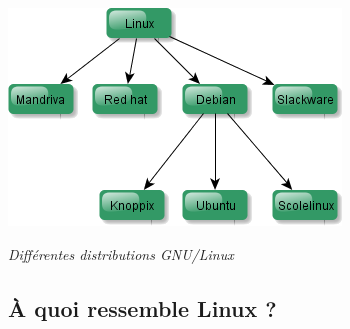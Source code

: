\documentclass[11pt,oneside]{article}
\begin{document}
\begin{rem}
%
%
%
%
%


\begin{center}
\includegraphics[width=.6\textwidth]{images/debian.png}

\textit{Différentes distributions GNU/Linux}

\end{center}

\end{rem}




\subsection{À quoi ressemble Linux ?}


\end{document}
